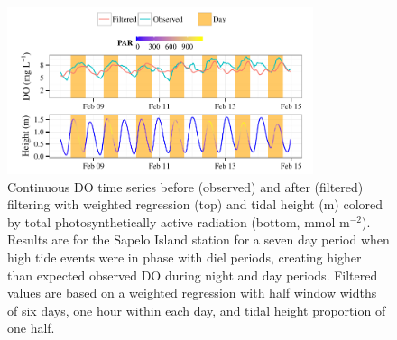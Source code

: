\documentclass[letterpaper,12pt,oneside]{article}\usepackage[]{graphicx}\usepackage[]{color}
\newenvironment{knitrout}{}{} %
\begin{document}
\centering\vspace*{\fill}
\begin{knitrout}
\color{fgcolor}\begin{figure}[!ht]


{\centering \includegraphics[width=0.8\textwidth]{figure/phase_in} 

}

\caption[Continuous \ac{DO} time series before (observed) and after (filtered) filtering with weighted regression (top) and tidal height (m) colored by total photosynthetically active radiation (bottom, mmol m$^{-2}$)]{Continuous \ac{DO} time series before (observed) and after (filtered) filtering with weighted regression (top) and tidal height (m) colored by total photosynthetically active radiation (bottom, mmol m$^{-2}$). Results are for the Sapelo Island station for a seven day period when high tide events were in phase with diel periods, creating higher than expected observed \ac{DO} during night and day periods. Filtered values are based on a weighted regression with half window widths of six days, one hour within each day, and tidal height proportion of one half.\label{fig:phase_in}}
\end{figure}


\end{knitrout}
\vfill
\clearpage
\end{document}
